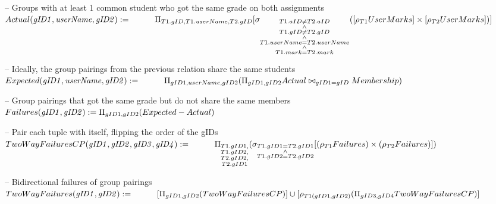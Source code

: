 \documentclass{article}
\newcommand{\var}[1]{\mathit{#1}}
\begin{document}
\begin{enumerate}
{-- Groups with at least 1 common student who got the same grade on both assignments \\[5pt]
$
Actual(\var{gID1, userName, gID2}) := \\[5pt]
    \hspace*{1cm}
	\Pi_{T1.gID, T1.userName, T2.gID}
	[\sigma_{\substack{T1.aID \neq T2.aID \\ \wedge \\ T1.gID \neq T2.gID \\ \wedge \\ T1.userName = T2.userName \\ \wedge \\ T1.mark = T2.mark}}
	([\rho_{T1}UserMarks] \times [\rho_{T2}UserMarks])] \\[10pt]
$

-- Ideally, the group pairings from the previous relation share the same students \\[5pt]
$
Expected(\var{gID1, userName, gID2}) := \\[5pt]
    \hspace*{1cm}
	\Pi_{gID1, userName, gID2}
	(\Pi_{gID1, gID2} Actual \bowtie_{gID1 = gID} Membership) \\[10pt]
$

-- Group pairings that got the same grade but do not share the same members \\[5pt]
$
Failures(\var{gID1, gID2}) :=
	\Pi_{gID1, gID2}
	(Expected - Actual) \\[10pt]
$

-- Pair each tuple with itself, flipping the order of the gIDs \\[5pt]
$
TwoWayFailuresCP(\var{gID1, gID2, gID3, gID4}) := \\[5pt]
    \hspace*{1cm}
	\Pi_{\substack{T1.gID1, \\ T1.gID2, \\ T2.gID2, \\ T2.gID1}}
	(\sigma_{\substack{T1.gID1 = T2.gID1 \\ \wedge \\ T1.gID2 = T2.gID2}} 
	[(\rho_{T1}Failures) \times (\rho_{T2}Failures)]) \\[10pt]
$

-- Bidirectional failures of group pairings \\[5pt]
$
TwoWayFailures(\var{gID1, gID2}) := \\[5pt]
    \hspace*{1cm}
    [\Pi_{gID1, gID2}
    (TwoWayFailuresCP)]
    \cup
    [\rho_{T1(gID1, gID2)}
    (\Pi_{gID3, gID4} TwoWayFailuresCP)] \\[10pt]
$

}
\end{enumerate}
\end{document}
